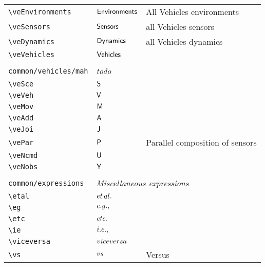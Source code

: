 \begin{longtable}{lll}
 \hline
{\color[rgb]{0.5,0.5,0.5}\texttt{\textbackslash veEnvironments}} & $\mathsf{Environments}$ &  All Vehicles environments \\ 
 {\color[rgb]{0.5,0.5,0.5}\texttt{\textbackslash veSensors}} & $\mathsf{Sensors}$ &  all Vehicles sensors\\ 
 {\color[rgb]{0.5,0.5,0.5}\texttt{\textbackslash veDynamics}} & $\mathsf{Dynamics}$ &  all Vehicles dynamics\\ 
 {\color[rgb]{0.5,0.5,0.5}\texttt{\textbackslash veVehicles}} & $\mathsf{Vehicles}$ & \\ 
  &  & \\ 
 {\color[rgb]{0.5,0.5,0.5}\texttt{common/vehicles/mah}} & \multicolumn{2}{l}{\emph{todo}}\\ 
 \hline
{\color[rgb]{0.5,0.5,0.5}\texttt{\textbackslash veSce}} & $\mathsf{S}$ & \\ 
 {\color[rgb]{0.5,0.5,0.5}\texttt{\textbackslash veVeh}} & $\mathsf{V}$ & \\ 
 {\color[rgb]{0.5,0.5,0.5}\texttt{\textbackslash veMov}} & $\mathsf{M}$ & \\ 
 {\color[rgb]{0.5,0.5,0.5}\texttt{\textbackslash veAdd}} & $\mathsf{A}$ & \\ 
 {\color[rgb]{0.5,0.5,0.5}\texttt{\textbackslash veJoi}} & $\mathsf{J}$ & \\ 
 {\color[rgb]{0.5,0.5,0.5}\texttt{\textbackslash vePar}} & $\mathsf{P}$ &  Parallel composition of sensors\\ 
 {\color[rgb]{0.5,0.5,0.5}\texttt{\textbackslash veNcmd}} & $\mathsf{U}$ & \\ 
 {\color[rgb]{0.5,0.5,0.5}\texttt{\textbackslash veNobs}} & $\mathsf{Y}$ & \\ 
  &  & \\ 
 {\color[rgb]{0.5,0.5,0.5}\texttt{common/expressions}} & \multicolumn{2}{l}{\emph{Miscellaneous expressions}}\\ 
 \hline
{\color[rgb]{0.5,0.5,0.5}\texttt{\textbackslash etal}} & ${et\,al.}$ & \\ 
 {\color[rgb]{0.5,0.5,0.5}\texttt{\textbackslash eg}} & ${e.g.},$ & \\ 
 {\color[rgb]{0.5,0.5,0.5}\texttt{\textbackslash etc}} & ${etc.}$ & \\ 
 {\color[rgb]{0.5,0.5,0.5}\texttt{\textbackslash ie}} & ${i.e.},$ & \\ 
 {\color[rgb]{0.5,0.5,0.5}\texttt{\textbackslash viceversa}} & ${vice versa}$ & \\ 
 {\color[rgb]{0.5,0.5,0.5}\texttt{\textbackslash vs}} & ${vs}$ &  Versus\\ 

\end{longtable}
